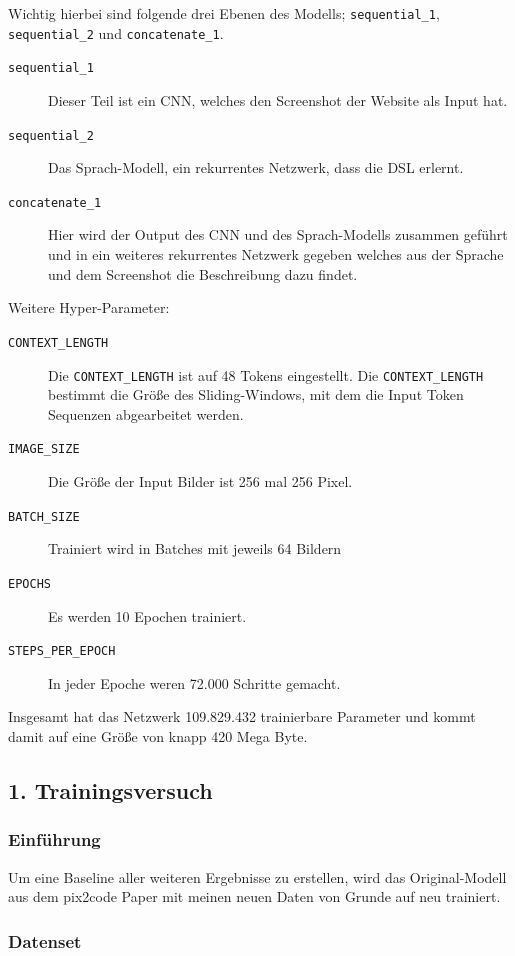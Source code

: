 \documentclass[pdftex,a4paper,halfparskip, article]{scrartcl}
\begin{document}
Wichtig hierbei sind folgende drei Ebenen des Modells; \texttt{sequential\_1}, \texttt{sequential\_2} und \texttt{concatenate\_1}. 

\begin{description}
	\item[\texttt{sequential\_1}] Dieser Teil ist ein CNN, welches den Screenshot der Website als Input hat.
	\item[\texttt{sequential\_2}] Das Sprach-Modell, ein rekurrentes Netzwerk, dass die DSL erlernt.
	\item[\texttt{concatenate\_1}] Hier wird der Output des CNN und des Sprach-Modells zusammen geführt und in ein weiteres rekurrentes Netzwerk gegeben welches aus der Sprache und dem Screenshot die Beschreibung dazu findet.
\end{description}

Weitere Hyper-Parameter:
\begin{description}
	\item[\texttt{CONTEXT\_LENGTH}] Die \texttt{CONTEXT\_LENGTH} ist auf 48 Tokens eingestellt. Die \texttt{CONTEXT\_LENGTH} bestimmt die Größe des Sliding-Windows, mit dem die Input Token Sequenzen abgearbeitet werden. 
	\item[\texttt{IMAGE\_SIZE}] Die Größe der Input Bilder ist 256 mal 256 Pixel.
	\item[\texttt{BATCH\_SIZE}] Trainiert wird in Batches mit jeweils 64 Bildern
	\item[\texttt{EPOCHS}] Es werden 10 Epochen trainiert.
	\item[\texttt{STEPS\_PER\_EPOCH}] In jeder Epoche weren 72.000 Schritte gemacht.	
\end{description}

Insgesamt hat das Netzwerk 109.829.432 trainierbare Parameter und kommt damit auf eine Größe von knapp 420 Mega Byte.

\subsection{1. Trainingsversuch}

\subsubsection*{Einführung}

Um eine Baseline aller weiteren Ergebnisse zu erstellen, wird das Original-Modell aus dem pix2code Paper mit meinen neuen Daten von Grunde auf neu trainiert. 

\subsubsection*{Datenset}
\end{document}
